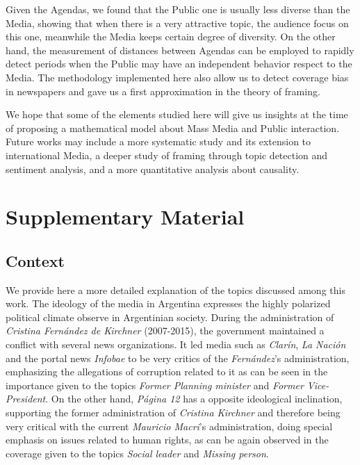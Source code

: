 \documentclass{bmcart}
\begin{document}
\par Given the Agendas, we found that the Public one is usually less diverse than the Media, showing that when there is a very attractive topic, the audience focus on this one, meanwhile the Media keeps certain degree of diversity. 
On the other hand, the measurement of distances between Agendas can be employed to rapidly detect periods when the Public may have an independent behavior respect to the Media. The methodology implemented here also allow us to detect coverage bias in newspapers and gave us a first approximation in the theory of framing. 
\par We hope that some of the elements studied here will give us insights at the time of proposing a mathematical model about Mass Media and Public interaction. Future works may include a more systematic study and its extension to international Media, a deeper study of framing through topic detection and sentiment analysis, and a more quantitative analysis about causality.

\newpage
\section*{Supplementary Material}
\subsection*{Context}
\label{sec:Context}

\par We provide here a more detailed explanation of the topics discussed among this work.
The ideology of the media in Argentina expresses the highly polarized political climate observe in Argentinian society.
During the administration of \emph{Cristina Fern\'andez de Kirchner} (2007-2015), the government maintained a conflict with several news organizations.
It led media such as \emph{Clar\'in}, \emph{La Naci\'on} and the portal news \emph{Infobae} to be very critics of the \emph{Fern\'andez}'s administration, emphasizing the allegations of corruption related to it as can be seen in the importance given to the topics \emph{Former Planning minister} and \emph{Former Vice-President}.
On the other hand, \emph{P\'agina 12} has a opposite ideological inclination, supporting the former administration of \emph{Cristina Kirchner} and therefore being very critical with the current \emph{Mauricio Macri}'s administration, doing special emphasis on issues related to human rights, as can be again observed in the coverage given to the topics \emph{Social leader} and \emph{Missing person}.
\end{document}
